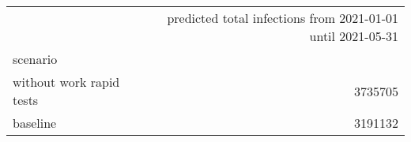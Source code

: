 \begin{tabular}{lr}
\toprule
{} &  predicted total infections from 2021-01-01 until 2021-05-31 \\
scenario                  &                                                              \\
\midrule
 without work rapid tests &                                            3735705 \\
 baseline                 &                                            3191132 \\
\bottomrule
\end{tabular}
